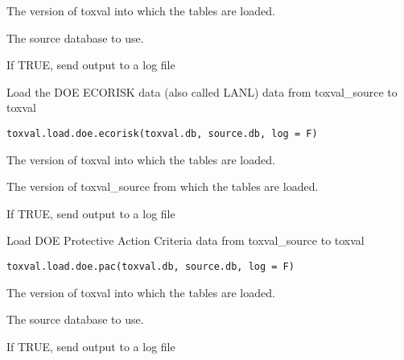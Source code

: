 \documentclass[letterpaper]{book}
\begin{document}
%
\begin{Arguments}
\begin{ldescription}
\item[\code{toxval.db}] The version of toxval into which the tables are loaded.

\item[\code{source.db}] The source database to use.

\item[\code{log}] If TRUE, send output to a log file
\end{ldescription}
\end{Arguments}
%
\begin{Description}\relax
Load the DOE ECORISK data (also called LANL) data from toxval\_source to toxval
\end{Description}
%
\begin{Usage}
\begin{verbatim}
toxval.load.doe.ecorisk(toxval.db, source.db, log = F)
\end{verbatim}
\end{Usage}
%
\begin{Arguments}
\begin{ldescription}
\item[\code{toxval.db}] The version of toxval into which the tables are loaded.

\item[\code{source.db}] The version of toxval\_source from which the tables are loaded.

\item[\code{log}] If TRUE, send output to a log file
\end{ldescription}
\end{Arguments}
%
\begin{Description}\relax
Load DOE Protective Action Criteria data from toxval\_source to toxval
\end{Description}
%
\begin{Usage}
\begin{verbatim}
toxval.load.doe.pac(toxval.db, source.db, log = F)
\end{verbatim}
\end{Usage}
%
\begin{Arguments}
\begin{ldescription}
\item[\code{toxval.db}] The version of toxval into which the tables are loaded.

\item[\code{source.db}] The source database to use.

\item[\code{log}] If TRUE, send output to a log file
\end{ldescription}
\end{Arguments}
\end{document}
